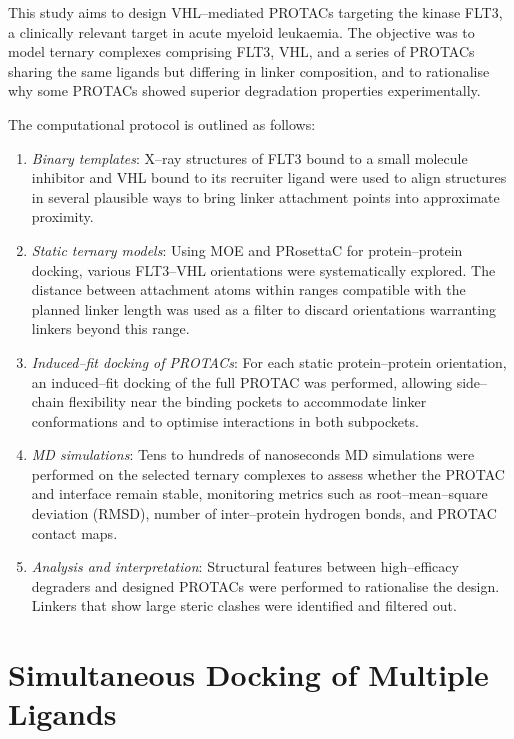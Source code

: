\documentclass[12pt]{article}
\begin{document}
This study aims to design VHL–mediated PROTACs targeting the kinase FLT3\cite{CH14_flt3protac2025}, a clinically relevant target in acute myeloid leukaemia. The objective was to model ternary complexes comprising FLT3, VHL, and a series of PROTACs sharing the same ligands but differing in linker composition, and to rationalise why some PROTACs showed superior degradation properties experimentally.

The computational protocol is outlined as follows:

\begin{enumerate}
  \item \emph{Binary templates}: X–ray structures of FLT3 bound to a small molecule inhibitor and VHL bound to its recruiter ligand were used to align structures in several plausible ways to bring linker attachment points into approximate proximity.  
  \item \emph{Static ternary models}:  Using MOE and PRosettaC for protein–protein docking, various FLT3–VHL orientations were systematically explored. The distance between attachment atoms within ranges compatible with the planned linker length was used as a filter to discard orientations warranting linkers beyond this range. 
  \item \emph{Induced–fit docking of PROTACs}: For each static protein–protein orientation, an induced–fit docking of the full PROTAC was performed, allowing side–chain flexibility near the binding pockets to accommodate linker conformations and to optimise interactions in both subpockets.  
  \item \emph{MD simulations}: Tens to hundreds of nanoseconds MD simulations were performed on the selected ternary complexes to assess whether the PROTAC and interface remain stable, monitoring metrics such as root–mean–square deviation (RMSD), number of inter–protein hydrogen bonds, and PROTAC contact maps.  
  \item \emph{Analysis and interpretation}: Structural features between high–efficacy degraders and designed PROTACs were performed to rationalise the design.  Linkers that show large steric clashes were identified and filtered out.
\end{enumerate}


\section{Simultaneous Docking of Multiple Ligands}
\end{document}
